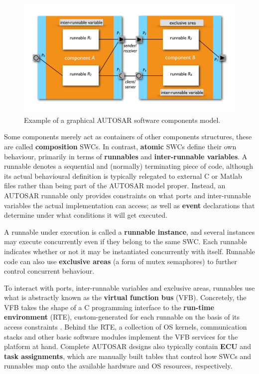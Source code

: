 \documentclass[twocolumn]{article}
\begin{document}
\begin{figure}
\includegraphics[page=1,width=\textwidth]{Fig}
\caption{\label{fig:model}{Example of a graphical AUTOSAR software components model.}}
\end{figure}


Some components merely act as containers of other components structures, these are called \textbf{composition} SWCs. In contrast, \textbf{atomic} SWCs define their own behaviour, primarily in terms of \textbf{runnables} and \textbf{inter-runnable variables}. A runnable denotes a sequential and (normally) terminating piece of code, although its actual behavioural definition is typically relegated to external C or Matlab files rather than being part of the AUTOSAR model proper. Instead, an AUTOSAR runnable only provides constraints on what ports and inter-runnable variables the actual implementation can access; as well as \textbf{event} declarations that determine under what conditions it will get executed.

A runnable under execution is called a \textbf{runnable instance}, and several instances may execute concurrently even if they belong to the same SWC. Each runnable indicates whether or not it may be instantiated concurrently with itself. Runnable code can also use \textbf{exclusive areas} (a form of mutex semaphores) to further control concurrent behaviour.

To interact with ports, inter-runnable variables and exclusive areas, runnables use what is abstractly known as the \textbf{virtual function bus} (VFB). Concretely, the VFB takes the shape of a C programming interface to the \textbf{run-time environment} (RTE), custom-generated for each runnable on the basis of its access constraints \cite{AR:RTE}. Behind the RTE, a collection of OS kernels, communication stacks and other basic software modules implement the VFB services for the platform at hand. Complete AUTOSAR designs also typically contain \textbf{ECU} and \textbf{task assignments}, which are manually built tables that control how SWCs and runnables map onto the available hardware and OS resources, respectively.
\end{document}

